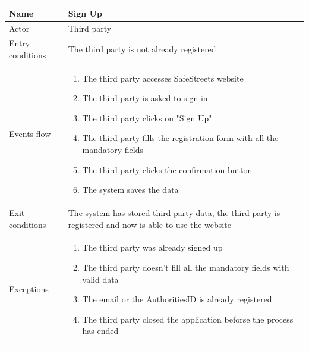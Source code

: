 \documentclass{article}
\begin{document}
\begin{table}[H]
    \begin{tabular}{|l|l|}
    \hline
     Name & \begin{minipage}[t]{0.7\textwidth}\textbf{Sign Up}\end{minipage} \\ \hline  
     Actor & \begin{minipage}[t]{0.7\textwidth} Third party\end{minipage} \\ \hline 
     Entry conditions & \begin{minipage}[t]{0.7\textwidth} The third party is
     not already registered\end{minipage} \\
     \hline 
     Events flow & \begin{minipage}[t]{0.7\textwidth} 
    \begin{enumerate}
        \item The third party accesses SafeStreets website
        \item The third party is asked to sign in
        \item The third party clicks on "Sign Up"
        \item The third party fills the registration form with all the mandatory
        fields
        \item The third party clicks the confirmation button
        \item The system saves the data
    \end{enumerate}
    \end{minipage} \\ \hline
     Exit conditions & \begin{minipage}[t]{0.7\textwidth} The system has stored
     third party data, the third party is registered and now is able to use the
     website\end{minipage} \\
     \hline
     Exceptions & \begin{minipage}[t]{0.7\textwidth}
    \begin{enumerate}
        \item The third party was already signed up
        \item The third party doesn't fill all the mandatory fields with valid
        data
        \item The email or the AuthoritiesID is already registered
        \item The third party closed the application beforse the process has
        ended
    \end{enumerate}    
    \end{minipage} \\ \hline
    \end{tabular}
\end{table}
\end{document}
